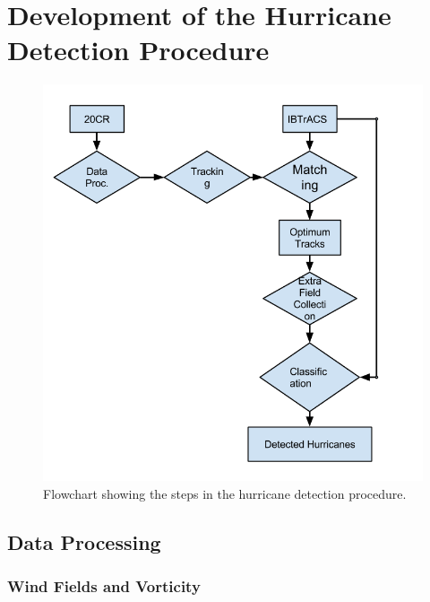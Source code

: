 \documentclass[pdftex,12pt,a4paper]{report}
\begin{document}

\chapter{Development of the Hurricane Detection Procedure}
\label{chap:development}


\begin{figure}[hb!]
    \centering
    \includegraphics[width=\textwidth]{figures/hurricane_detection_procedure}
    \caption{Flowchart showing the steps in the hurricane detection procedure.}
    \label{fig:hurricane_detection_proc}
\end{figure}

\section{Data Processing}

\subsection{Wind Fields and Vorticity}
\end{document}
